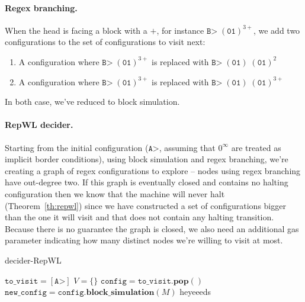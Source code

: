 \paragraph{Regex branching.} When the head is facing a block with a $+$, for instance $\texttt{B>} \; (\texttt{01})^{3+}$, we add two configurations to the set of configurations to visit next:
\begin{enumerate}
    \item A configuration where $\texttt{B>} \; (\texttt{01})^{3+}$ is replaced with $\texttt{B>} \; (\texttt{01}) \; (\texttt{01})^{2}$
    \item A configuration where $\texttt{B>} \; (\texttt{01})^{3+}$ is replaced with  $\texttt{B>} \; (\texttt{01}) \; (\texttt{01})^{3+}$
\end{enumerate}
In both case, we've reduced to block simulation.

\paragraph{RepWL decider.} Starting from the initial configuration (\ie $\texttt{A>}$, assuming that $0^\infty$ are treated as implicit border conditions), using block simulation and regex branching, we're creating a graph of regex configurations to explore -- nodes using regex branching have out-degree two. If this graph is eventually closed and contains no halting configuration then we know that the machine will never halt (Theorem~\ref{th:repwl}) since we have constructed a set of configurations bigger than the one it will visit and that does not contain any halting transition. Because there is no guarantee the graph is closed, we also need an additional gas parameter indicating how many distinct nodes we're willing to visit at most.


\begin{algorithm}
    \caption{{\sc decider-RepWL}}\label{alg:RepWL}

    \begin{algorithmic}[1]
        \State
        \State $\texttt{to\_visit} = [\texttt{A>}]$
        \State $V = \{\}$ 
        \State {}
        \State $\texttt{config} = \texttt{to\_visit}.\textbf{pop}()$
        \State {}
        \State $\texttt{new\_config} = \texttt{config}.\textbf{block\_simulation}(M)$
        \State heyeeeds
        \EndIf
        \EndWhile



    \end{algorithmic}
\end{algorithm}